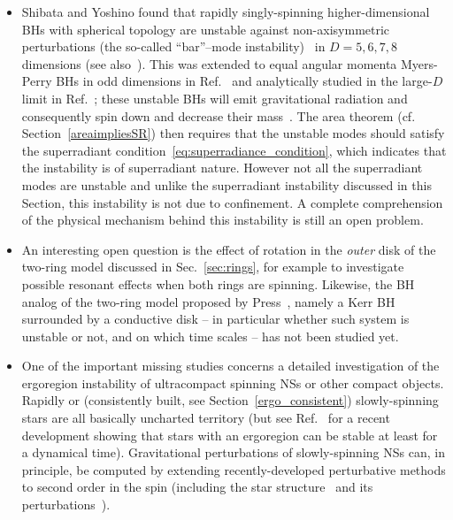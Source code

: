 \documentclass[11pt]{article}
\numberwithin{equation}{section} %
\begin{document}
\begin{itemize}
\item Shibata and Yoshino found that rapidly singly-spinning higher-dimensional BHs with spherical topology are 
unstable against non-axisymmetric perturbations (the so-called ``bar''--mode 
instability)~\cite{Shibata:2009ad,Shibata:2010wz} in $D=5,6,7,8$ dimensions (see also~\cite{Dias:2014eua}). This was 
extended to equal angular momenta Myers-Perry BHs in odd dimensions in Ref.~\cite{Hartnett:2013fba} and analytically 
studied in the large-$D$ limit in Ref.~\cite{Emparan:2014jca}; these unstable BHs will emit gravitational radiation and 
consequently spin down and decrease their mass~\cite{Shibata:2010wz}. The area theorem (cf. Section~\ref{areaimpliesSR}) 
then requires that the unstable modes should satisfy the superradiant condition~\eqref{eq:superradiance_condition}, 
which indicates that the instability is of superradiant nature. However not all the superradiant modes are unstable and 
unlike the superradiant instability discussed in this Section, this instability is not due to confinement. A complete 
comprehension of the physical mechanism behind this instability is still an open problem.

\item An interesting open question is the effect of rotation in the \emph{outer} disk of the two-ring model discussed in Sec.~\ref{sec:rings}, for example to investigate possible resonant effects when both rings are spinning. Likewise, the BH analog of the two-ring model proposed by Press~\cite{PressRing}, namely a Kerr BH surrounded by a conductive disk -- in particular whether such system is unstable or not, and on which time scales -- has not been studied yet.

\item One of the important missing studies concerns a detailed investigation of the ergoregion instability of ultracompact spinning NSs or other compact objects.
Rapidly or (consistently built, see Section~\ref{ergo_consistent}) slowly-spinning stars are all basically uncharted 
territory (but see Ref.~\cite{Tsokaros:2019mlz} for a recent development showing that stars with an ergoregion can be 
stable at least for a dynamical time).
Gravitational perturbations of slowly-spinning NSs can, in principle, be computed by extending recently-developed perturbative methods to second order in the spin (including the star structure~\cite{Hartle:1967he} and its perturbations~\cite{Kojima:1992ie,1993ApJ...414..247K,Pani:2013pma}).



\end{itemize}
\end{document}
